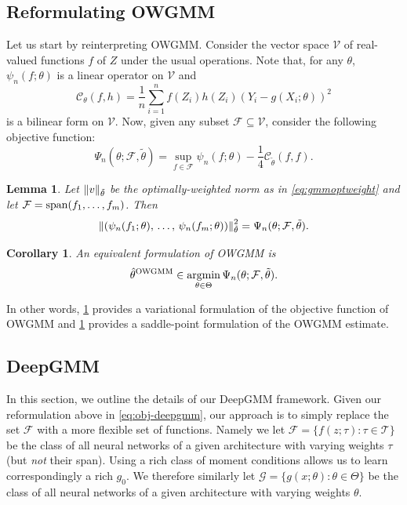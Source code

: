 \documentclass{article}
\theoremstyle{plain}
\newtheorem{lemma}{Lemma}
\newtheorem{corollary}[theorem]{Corollary}
\theoremstyle{definition}
\newcommand\T{\mathcal T}
\begin{document}
\subsection{Reformulating OWGMM}
Let us start by reinterpreting OWGMM.
%
Consider the 
%
vector space $\mathcal V$ of 
real-valued functions $f$ of $Z$ under the usual operations.
%
Note that, for any $\theta$, $\psi_n(f;\theta)$ is a linear operator on $\mathcal V$ and
$$
\mathcal C_{\theta}(f,h)=\frac1n\sum_{i=1}^n{f(Z_i)h(Z_i)(Y_i-g(X_i;\theta))^2}
$$
is a bilinear form on $\mathcal V$. 
%
Now, given any subset $\mathcal F\subseteq\mathcal V$, consider the following objective function:
\begin{equation}\label{eq:obj-variational}
\Psi_n(\theta;\mathcal F,\tilde\theta)=\sup_{f\in\mathcal F}\psi_n(f;\theta)-\frac14\mathcal C_{\tilde\theta}(f,f).
\end{equation}
%
%
\begin{lemma}\label{lemma:gmmequiv}
Let $\|v\|_{\tilde\theta}$ be the optimally-weighted norm as in \cref{eq:gmmoptweight} and let $\mathcal F=\operatorname{span}(f_1,\dots,f_m)$. Then
$$\left\|(\psi_n(f_1;\theta),\,\dots,\,\psi_n(f_m;\theta))\right\|_{\tilde\theta}^2=\Psi_n(\theta;\mathcal F,\tilde\theta).$$
\end{lemma}
%
\begin{corollary}\label{cor:gmmequiv}
An equivalent formulation of OWGMM is
\begin{equation}\label{eq:obj-deepgmm}
\hat\theta^\text{OWGMM}\in\argmin_{\theta\in\Theta}\Psi_n(\theta;\mathcal F,\tilde\theta).
\end{equation}
\end{corollary}
In other words, \cref{lemma:gmmequiv} provides a variational formulation of the objective function of OWGMM and \cref{cor:gmmequiv} provides a saddle-point formulation of the OWGMM estimate. 

%


%

%

%

%

%

%

\subsection{DeepGMM}

In this section, we outline the details of our DeepGMM framework.
Given our reformulation above in \cref{eq:obj-deepgmm}, our approach is 
to simply replace the set $\mathcal F$ with a more flexible set of functions. 
Namely we let
$\mathcal F=\{f(z;\tau):\tau\in\T\}$ be the class of all neural networks of a given architecture with varying weights $\tau$ (but \emph{not} their span).
Using a rich class of moment conditions allows us to learn correspondingly a rich $g_0$. We therefore similarly let $\mathcal G=\{g(x;\theta):\theta\in \Theta\}$ be the class of all neural networks of a given architecture with varying weights $\theta$.
\end{document}
